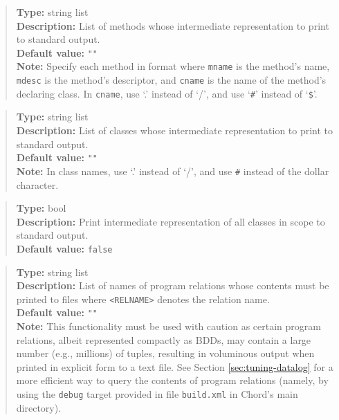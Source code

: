 \begin{quote}
{\bf Type:} string list  \\
{\bf Description:} List of methods whose intermediate representation to print to standard output. \\
{\bf Default value:} {\tt ""} \\
{\bf Note:} Specify each method in format  where {\tt mname} is the method's name, {\tt mdesc} is the method's descriptor, and {\tt cname} is the name of the method's declaring class. In {\tt cname}, use `.' instead of `/', and use `{\tt \#}' instead of `{\tt \$}'. 
\end{quote}

\begin{quote}
{\bf Type:} string list  \\
{\bf Description:} List of classes whose intermediate representation to print to standard output. \\
{\bf Default value:} {\tt ""} \\
{\bf Note:} In class names, use `.' instead of `/', and use {\tt \#} instead of the dollar character. 
\end{quote}

\begin{quote}
{\bf Type:} bool \\
{\bf Description:} Print intermediate representation of all classes in scope to standard output. \\
{\bf Default value:} {\tt false}
\end{quote}

\begin{quote}
{\bf Type:} string list  \\
{\bf Description:} List of names of program relations whose contents must be printed to files  where
{\tt <RELNAME>} denotes the relation name. \\
{\bf Default value:} {\tt ""} \\
{\bf Note:} This functionality must be used with caution as certain program relations, albeit represented compactly as BDDs, may contain
 a large number (e.g., millions) of tuples, resulting in voluminous output when printed in explicit form to a text file.  See Section
 \ref{sec:tuning-datalog} for a more efficient way to query the contents of program relations (namely, by using the {\tt debug}
 target provided in file {\tt build.xml} in Chord's main directory).
\end{quote}

